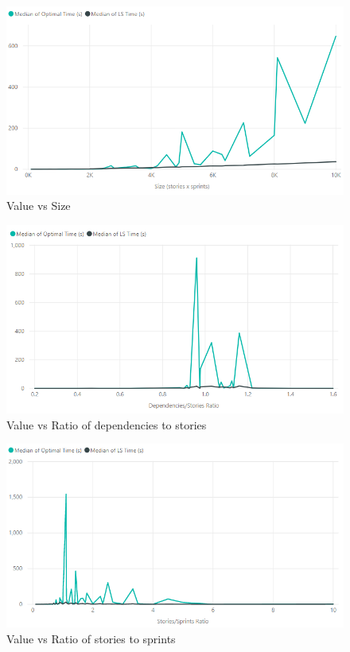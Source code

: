 \begin{figure}[h!]
    \centering
    \includegraphics[width=\textwidth]{Figures/FinalResults/annealing_time_size.png}
     \caption{Value vs Size}
     \label{fig:time_vs_size}
\end{figure}

\begin{figure}[h!]
    \centering
    \includegraphics[width=\textwidth]{Figures/FinalResults/annealing_time_dependencies_stories.png}
     \caption{Value vs Ratio of dependencies to stories}
     \label{fig:time_vs_dependencies_stories}
\end{figure}

\begin{figure}[h!]
    \centering
    \includegraphics[width=\textwidth]{Figures/FinalResults/annealing_time_stories_sprints.png}
     \caption{Value vs Ratio of stories to sprints}
     \label{fig:time_vs_stories_sprints}
\end{figure}

